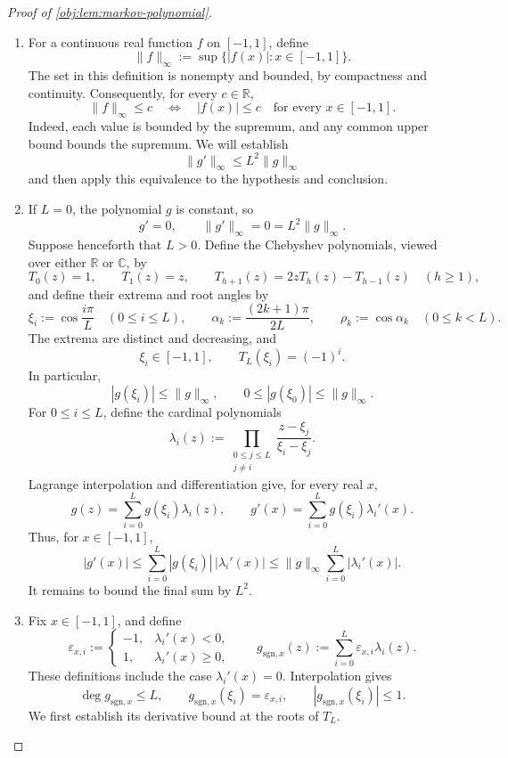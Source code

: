 \begin{proof}[Proof of \cref{obj:lem:markov-polynomial}]
\begin{enumerate}
\item For a continuous real function \(f\) on \([-1,1]\), define
\[
\|f\|_{\infty}
  :=\sup\{|f(x)|:x\in[-1,1]\}.
\]
The set in this definition is nonempty and bounded, by compactness and continuity. Consequently, for every \(c\in\mathbb R\),
\[
\|f\|_{\infty}\le c
\quad\Longleftrightarrow\quad
|f(x)|\le c\quad\text{for every }x\in[-1,1].
\]
Indeed, each value is bounded by the supremum, and any common upper bound bounds the supremum. We will establish
\[
\|g'\|_{\infty}\le L^2\|g\|_{\infty}
\]
and then apply this equivalence to the hypothesis and conclusion.

\item If \(L=0\), the polynomial \(g\) is constant, so
\[
g'=0,\qquad \|g'\|_{\infty}=0=L^2\|g\|_{\infty}.
\]
Suppose henceforth that \(L>0\). Define the Chebyshev polynomials, viewed over either \(\mathbb R\) or \(\mathbb C\), by
\[
T_0(z)=1,\qquad T_1(z)=z,\qquad
T_{h+1}(z)=2zT_h(z)-T_{h-1}(z)\quad(h\ge1),
\]
and define their extrema and root angles by
\[
\xi_i:=\cos\frac{i\pi}{L}\quad(0\le i\le L),\qquad
\alpha_k:=\frac{(2k+1)\pi}{2L},\qquad
\rho_k:=\cos\alpha_k\quad(0\le k<L).
\]
The extrema are distinct and decreasing, and
\[
\xi_i\in[-1,1],\qquad
T_L(\xi_i)=(-1)^i.
\]
In particular,
\[
|g(\xi_i)|\le\|g\|_{\infty},
\qquad
0\le |g(\xi_0)|\le\|g\|_{\infty}.
\]
For \(0\le i\le L\), define the cardinal polynomials
\[
\lambda_i(z):=
\prod_{\substack{0\le j\le L\\j\ne i}}
\frac{z-\xi_j}{\xi_i-\xi_j}.
\]
Lagrange interpolation and differentiation give, for every real \(x\),
\[
g(z)=\sum_{i=0}^{L}g(\xi_i)\lambda_i(z),
\qquad
g'(x)=\sum_{i=0}^{L}g(\xi_i)\lambda_i'(x).
\]
Thus, for \(x\in[-1,1]\),
\[
|g'(x)|
\le\sum_{i=0}^{L}|g(\xi_i)|\,|\lambda_i'(x)|
\le\|g\|_{\infty}\sum_{i=0}^{L}|\lambda_i'(x)|.
\]
It remains to bound the final sum by \(L^2\).

\item Fix \(x\in[-1,1]\), and define
\[
\varepsilon_{x,i}:=
\begin{cases}
-1,&\lambda_i'(x)<0,\\
1,&\lambda_i'(x)\ge0,
\end{cases}
\qquad
g_{\mathrm{sgn},x}(z):=\sum_{i=0}^{L}\varepsilon_{x,i}\lambda_i(z).
\]
These definitions include the case \(\lambda_i'(x)=0\). Interpolation gives
\[
\deg g_{\mathrm{sgn},x}\le L,\qquad
g_{\mathrm{sgn},x}(\xi_i)=\varepsilon_{x,i},
\qquad
|g_{\mathrm{sgn},x}(\xi_i)|\le1.
\]
We first establish its derivative bound at the roots of \(T_L\).


\end{enumerate}
\end{proof}
